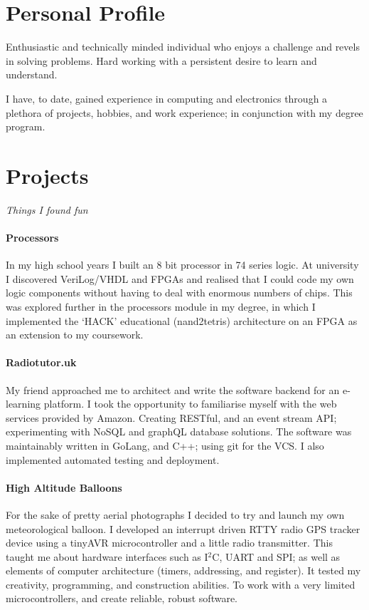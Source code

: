 \documentclass[9pt,a4paper]{article}
\begin{document}
\begin{multicols*}{3}
\section*{Personal Profile}
\vspace{-.3cm}
Enthusiastic and technically minded individual who enjoys a challenge and revels in solving problems.
Hard working with a persistent desire to learn and understand.

I have, to date, gained experience in computing and electronics through a plethora of projects, hobbies, and work experience;
in conjunction with my degree program.

\section*{Projects}
\vspace*{-.3cm}
\textit{Things I found fun}
\vspace*{-.3cm}

\paragraph{Processors} In my high school years I built an 8 bit processor in 74 series logic.
At university I discovered VeriLog/VHDL and FPGAs and realised that I could code my own logic components without having to deal with enormous numbers of chips.
This was explored further in the processors module in my degree, in which I implemented the `HACK' educational (nand2tetris) architecture on an FPGA as an extension to my coursework.

\paragraph{Radiotutor.uk} My friend approached me to architect and write the software backend for an e-learning platform.
I took the opportunity to familiarise myself with the web services provided by Amazon.
Creating RESTful, and an event stream API;
experimenting with NoSQL and graphQL database solutions.
The software was maintainably written in GoLang, and C++; using git for the VCS.
I also implemented automated testing and deployment.

\paragraph{High Altitude Balloons} For the sake of pretty aerial photographs I decided to try and launch my own meteorological balloon.
I developed an interrupt driven RTTY radio GPS tracker device using a tinyAVR microcontroller and a little radio transmitter.
This taught me about hardware interfaces such as I$^2$C, UART and SPI;
as well as elements of computer architecture (timers, addressing, and register).
It tested my creativity, programming, and construction abilities.
To work with a very limited microcontrollers, and create reliable, robust software.


\end{multicols*}
\end{document}
